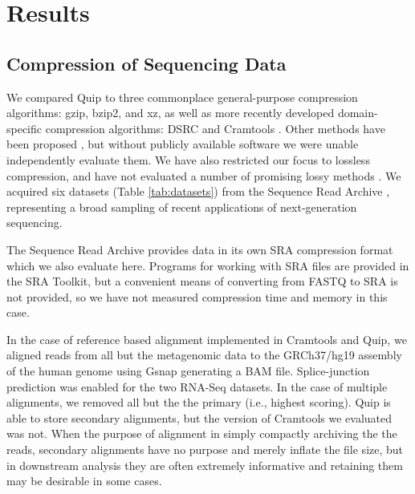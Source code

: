 \documentclass[twocolumn]{article}
\begin{document}
\section{Results}
\label{section:results}

\subsection{Compression of Sequencing Data}


We compared Quip to three commonplace general-purpose compression algorithms:
gzip, bzip2, and xz, as well as more recently developed domain-specific
compression algorithms: DSRC \citep{Deorowicz2011} and Cramtools \citep{Hsi-
YangFritz2011}. Other methods have been proposed \citep{Tembe2010,
Kozanitis2011, Bhola2011, Sakib2011}, but without publicly available software
we were unable independently evaluate them. We have also restricted our focus
to lossless compression, and have not evaluated a number of promising lossy
methods \citep{Hsi-YangFritz2011,Wan2011,Hach2012}. We acquired six datasets
(Table \ref{tab:datasets}) from the Sequence Read Archive
\citep{Leinonen2011}, representing a broad sampling of recent applications of
next-generation sequencing.

The Sequence Read Archive provides data in its own SRA compression format
which we also evaluate here. Programs for working with SRA files are provided
in the SRA Toolkit, but a convenient means of converting from FASTQ to SRA is
not provided, so we have not measured compression time and memory in this
case.


In the case of reference based alignment implemented in Cramtools and Quip, we
aligned reads from all but the metagenomic data to the GRCh37/hg19 assembly of
the human genome using Gsnap generating a BAM file. Splice-junction prediction
was enabled for the two RNA-Seq datasets. In the case of multiple alignments,
we removed all but the the primary (i.e., highest scoring). Quip is able to
store secondary alignments, but the version of Cramtools we evaluated was not.
When the purpose of alignment in simply compactly archiving the the reads,
secondary alignments have no purpose and merely inflate the file size, but in
downstream analysis they are often extremely informative and retaining them
may be desirable in some cases.

\end{document}
